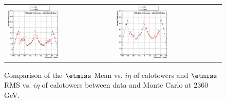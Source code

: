 \begin{figure}[h!]
 \centering
 \begin{tabular}{ll}
  \includegraphics[width=0.5\textwidth]{plots_DataVsMC_MB_2360GeV/g_calometPtMean_vs_ieta_2360.eps} &
  \includegraphics[width=0.5\textwidth]{plots_DataVsMC_MB_2360GeV/g_calometPtRMS_vs_ieta_2360.eps} \\
 \end{tabular}
 \caption{\small Comparison of the $\etmiss$ Mean vs. $i\eta$ of calotowers and $\etmiss$ RMS vs. $i\eta$ of calotowers between 
          data and Monte Carlo at $2360$ GeV.\label{fig:MET_MeanRMS_vs_ieta_2360}}
\end{figure}

